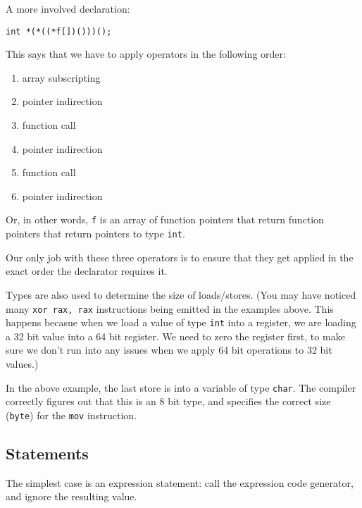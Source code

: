 \documentclass[12pt]{article}
\begin{document}
A more involved declaration:
\begin{center}
\begin{BVerbatim}
int *(*((*f[])()))();
\end{BVerbatim}
\end{center}
This says that we have to apply operators in the following order:
\begin{enumerate}
	\item array subscripting
	\item pointer indirection
	\item function call
	\item pointer indirection
	\item function call
	\item pointer indirection
\end{enumerate}
Or, in other words, \texttt{f} is an array of function pointers that return
function pointers that return pointers to type \texttt{int}.

Our only job with these three operators is to ensure that they get applied in
the exact order the declarator requires it.

Types are also used to determine the size of loads/stores. (You may have noticed
many \texttt{xor rax, rax} instructions being emitted in the examples above.
This happens becasue when we load a value of type \texttt{int} into a register,
we are loading a 32 bit value into a 64 bit register. We need to zero the
register first, to make sure we don't run into any issues when we apply 64 bit
operations to 32 bit values.)


In the above example, the last store is into a variable of type \texttt{char}.
The compiler correctly figures out that this is an 8 bit type, and specifies
the correct size (\texttt{byte}) for the \texttt{mov} instruction.

\subsection{Statements}
The simplest case is an expression statement: call the expression code
generator, and ignore the resulting value.
\end{document}
